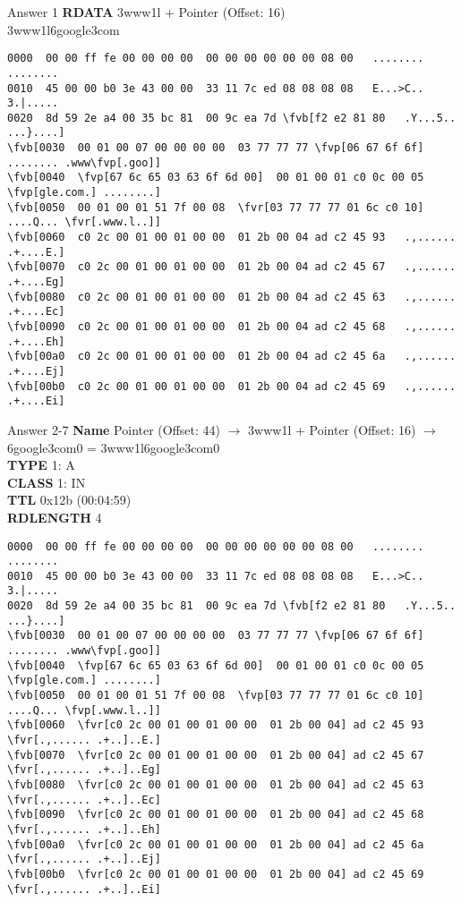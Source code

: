 \documentclass{beamer}
\newcommand*{\fvr}[1]{\textcolor{red}{#1}}
\newcommand*{\fvb}[1]{\textcolor{blue}{#1}}
\newcommand*{\fvp}[1]{\textcolor{purple}{#1}}
\begin{document}
  \begin{frame}[fragile]{\mytitle}{Answer 1}
    \textbf{RDATA} 3www1l + Pointer (Offset: 16)\\
    3www1l6google3com
    \vfill
    \tiny
    \begin{Verbatim}[commandchars=\\\[\]]
0000  00 00 ff fe 00 00 00 00  00 00 00 00 00 00 08 00   ........ ........
0010  45 00 00 b0 3e 43 00 00  33 11 7c ed 08 08 08 08   E...>C.. 3.|.....
0020  8d 59 2e a4 00 35 bc 81  00 9c ea 7d \fvb[f2 e2 81 80   .Y...5.. ...}....]
\fvb[0030  00 01 00 07 00 00 00 00  03 77 77 77 \fvp[06 67 6f 6f]   ........ .www\fvp[.goo]]
\fvb[0040  \fvp[67 6c 65 03 63 6f 6d 00]  00 01 00 01 c0 0c 00 05   \fvp[gle.com.] ........]
\fvb[0050  00 01 00 01 51 7f 00 08  \fvr[03 77 77 77 01 6c c0 10]   ....Q... \fvr[.www.l..]]
\fvb[0060  c0 2c 00 01 00 01 00 00  01 2b 00 04 ad c2 45 93   .,...... .+....E.]
\fvb[0070  c0 2c 00 01 00 01 00 00  01 2b 00 04 ad c2 45 67   .,...... .+....Eg]
\fvb[0080  c0 2c 00 01 00 01 00 00  01 2b 00 04 ad c2 45 63   .,...... .+....Ec]
\fvb[0090  c0 2c 00 01 00 01 00 00  01 2b 00 04 ad c2 45 68   .,...... .+....Eh]
\fvb[00a0  c0 2c 00 01 00 01 00 00  01 2b 00 04 ad c2 45 6a   .,...... .+....Ej]
\fvb[00b0  c0 2c 00 01 00 01 00 00  01 2b 00 04 ad c2 45 69   .,...... .+....Ei]
    \end{Verbatim}
\end{frame}


  \begin{frame}[fragile]{\mytitle}{Answer 2-7}
    \textbf{Name} Pointer (Offset: 44) $\rightarrow$ 3www1l + Pointer (Offset: 16) $\rightarrow$ 6google3com0 = 3www1l6google3com0\\
    \textbf{TYPE} 1: A\\
    \textbf{CLASS} 1: IN\\
    \textbf{TTL} 0x12b (00:04:59)\\
    \textbf{RDLENGTH} 4\\
    \vfill
    \tiny
    \begin{Verbatim}[commandchars=\\\[\]]
0000  00 00 ff fe 00 00 00 00  00 00 00 00 00 00 08 00   ........ ........
0010  45 00 00 b0 3e 43 00 00  33 11 7c ed 08 08 08 08   E...>C.. 3.|.....
0020  8d 59 2e a4 00 35 bc 81  00 9c ea 7d \fvb[f2 e2 81 80   .Y...5.. ...}....]
\fvb[0030  00 01 00 07 00 00 00 00  03 77 77 77 \fvp[06 67 6f 6f]   ........ .www\fvp[.goo]]
\fvb[0040  \fvp[67 6c 65 03 63 6f 6d 00]  00 01 00 01 c0 0c 00 05   \fvp[gle.com.] ........]
\fvb[0050  00 01 00 01 51 7f 00 08  \fvp[03 77 77 77 01 6c c0 10]   ....Q... \fvp[.www.l..]]
\fvb[0060  \fvr[c0 2c 00 01 00 01 00 00  01 2b 00 04] ad c2 45 93   \fvr[.,...... .+..]..E.]
\fvb[0070  \fvr[c0 2c 00 01 00 01 00 00  01 2b 00 04] ad c2 45 67   \fvr[.,...... .+..]..Eg]
\fvb[0080  \fvr[c0 2c 00 01 00 01 00 00  01 2b 00 04] ad c2 45 63   \fvr[.,...... .+..]..Ec]
\fvb[0090  \fvr[c0 2c 00 01 00 01 00 00  01 2b 00 04] ad c2 45 68   \fvr[.,...... .+..]..Eh]
\fvb[00a0  \fvr[c0 2c 00 01 00 01 00 00  01 2b 00 04] ad c2 45 6a   \fvr[.,...... .+..]..Ej]
\fvb[00b0  \fvr[c0 2c 00 01 00 01 00 00  01 2b 00 04] ad c2 45 69   \fvr[.,...... .+..]..Ei]
    \end{Verbatim}
\end{frame}
  
\end{document}
